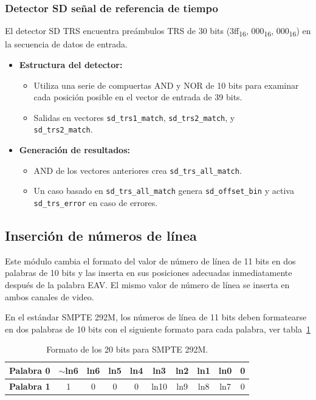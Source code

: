 \subsubsection{Detector SD señal de referencia de tiempo}

El detector SD TRS encuentra preámbulos TRS de 30 bits (3ff\textsubscript{16},
000\textsubscript{16}, 000\textsubscript{16}) en
la secuencia de datos de entrada.

\begin{itemize}
    \item \textbf{Estructura del detector:}
    \begin{itemize}
        \item Utiliza una serie de compuertas AND y NOR de 10 bits para examinar cada posición posible en el vector de entrada de 39 bits.
        \item Salidas en vectores \texttt{sd\_trs1\_match}, \texttt{sd\_trs2\_match}, y \\
        \texttt{sd\_trs2\_match}.
    \end{itemize}
    
    \item \textbf{Generación de resultados:}
    \begin{itemize}
        \item AND de los vectores anteriores crea \texttt{sd\_trs\_all\_match}.
        \item Un caso basado en \texttt{sd\_trs\_all\_match} genera \texttt{sd\_offset\_bin} y activa \texttt{sd\_trs\_error} en caso de errores.
    \end{itemize}
\end{itemize}

\subsection{Inserción de números de línea}

Este módulo cambia el formato del valor de número de línea de 11 bits en dos
palabras de 10 bits y las inserta en sus posiciones adecuadas inmediatamente
después de la palabra EAV\@. El mismo valor
de número de línea se inserta en ambos canales de video.

En el estándar SMPTE 292M, los números de línea de 11 bits deben formatearse en
dos palabras de 10 bits con el siguiente formato para cada palabra, ver tabla~\ref{tab:11bits}

\begin{table}[h]
  \centering
  \caption{Formato de los 20 bits para SMPTE 292M.}\label{tab:11bits}
  \begin{tabular}{lccccccccc}
    \toprule
    \textbf{Palabra 0} & $\sim$ln6 & ln6 & ln5 & ln4 & ln3 & ln2 & ln1 & ln0 & 0 \\
    \hline
    \textbf{Palabra 1} & 1 & 0 & 0 & 0 & ln10 & ln9 & ln8 & ln7 & 0 \\
    \bottomrule
    \hline
  \end{tabular}
\end{table}

